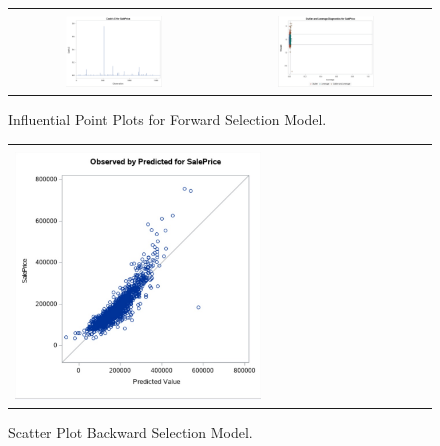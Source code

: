 \documentclass[11pt]{scrartcl} %
\begin{document}
\begin{figure}[H] %
	\centering
	\begin{tabular}{p{} p{}}
\hline	
	\multicolumn{1}{|c}{} &  \multicolumn{1}{c|}{} \\
		\multicolumn{1}{|c}{\includegraphics[width=0.48\textwidth]{../graphics/A2FWcooks}} &
		\multicolumn{1}{c|}{\includegraphics[width=0.48\textwidth]{../graphics/A2FWlev}}\\
		\hline
	\end{tabular}		
	\caption{Influential Point Plots for Forward Selection Model.}
	\label{fig:A2FWIP}
\end{figure}
\begin{figure}[H] %
	\centering
	\begin{tabular}{| p{}|}
	\hline
	\\
	\includegraphics[width=0.60\textwidth]{../graphics/A2BWscatt}\\
	\hline
	\end{tabular}	
	\caption{Scatter Plot Backward Selection Model.}
	\label{fig:A2BWscatt}
\end{figure}
\end{document}

